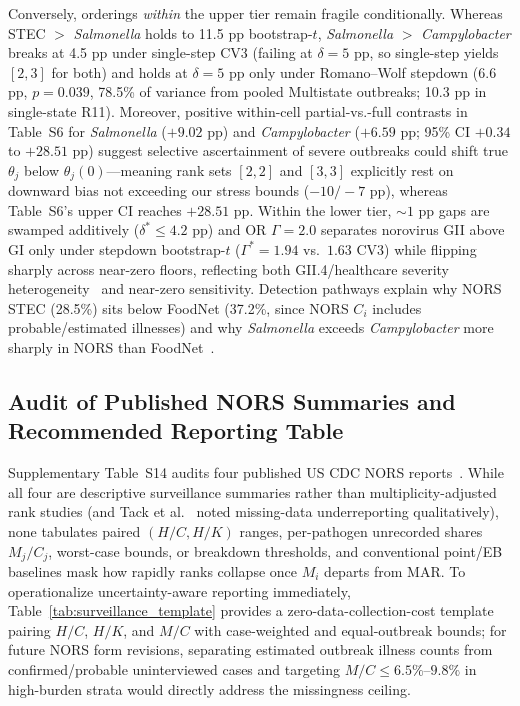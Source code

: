 Conversely, orderings \textit{within} the upper tier remain fragile conditionally. Whereas STEC $>$ \textit{Salmonella} holds to 11.5 pp bootstrap-$t$, \textit{Salmonella} $>$ \textit{Campylobacter} breaks at 4.5 pp under single-step CV3 (failing at $\delta = 5\text{ pp}$, so single-step yields $[2,3]$ for both) and holds at $\delta = 5\text{ pp}$ only under Romano--Wolf stepdown (6.6 pp, $p = 0.039$, 78.5\% of variance from pooled Multistate outbreaks; 10.3 pp in single-state R11). Moreover, positive within-cell partial-vs.-full contrasts in Table~S6 for \textit{Salmonella} ($+9.02\text{ pp}$) and \textit{Campylobacter} ($+6.59\text{ pp}$; 95\% CI $+0.34$ to $+28.51\text{ pp}$) suggest selective ascertainment of severe outbreaks could shift true $\theta_j$ below $\theta_j(0)$---meaning rank sets $[2,2]$ and $[3,3]$ explicitly rest on downward bias not exceeding our stress bounds ($-10/-7\text{ pp}$), whereas Table~S6's upper CI reaches $+28.51\text{ pp}$. Within the lower tier, $\sim 1\text{ pp}$ gaps are swamped additively ($\delta^{*} \le 4.2\text{ pp}$) and OR $\Gamma = 2.0$ separates norovirus GII above GI only under stepdown bootstrap-$t$ ($\Gamma^{*} = 1.94$ vs.\ $1.63$ CV3) while flipping sharply across near-zero floors, reflecting both GII.4/healthcare severity heterogeneity~\cite{vega2014genotypic,grass2013epidemiology,burke2019norovirus} and near-zero sensitivity. Detection pathways explain why NORS STEC (28.5\%) sits below FoodNet (37.2\%, since NORS $C_i$ includes probable/estimated illnesses) and why \textit{Salmonella} exceeds \textit{Campylobacter} more sharply in NORS than FoodNet~\cite{ebel2016comparing,li2010evaluation,hedberg2024estimating}.

\subsection{Audit of Published NORS Summaries and Recommended Reporting Table}\label{sec:disc-audit}

Supplementary Table~S14 audits four published US CDC NORS reports~\cite{deweymattia2018surveillance,tack2021shiga,cdcsurveillance2019,wikswo2022enteric}. While all four are descriptive surveillance summaries rather than multiplicity-adjusted rank studies (and Tack et al.~\cite{tack2021shiga} noted missing-data underreporting qualitatively), none tabulates paired $(H/C, H/K)$ ranges, per-pathogen unrecorded shares $M_j/C_j$, worst-case bounds, or breakdown thresholds, and conventional point/EB baselines mask how rapidly ranks collapse once $M_i$ departs from MAR. To operationalize uncertainty-aware reporting immediately, Table~\ref{tab:surveillance_template} provides a zero-data-collection-cost template pairing $H/C$, $H/K$, and $M/C$ with case-weighted and equal-outbreak bounds; for future NORS form revisions, separating estimated outbreak illness counts from confirmed/probable uninterviewed cases and targeting $M/C \le 6.5\%$--$9.8\%$ in high-burden strata would directly address the missingness ceiling.

